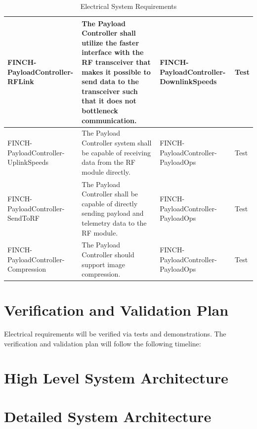 \documentclass[12pt,a4paper]{article}
\begin{document}
\begin{table}[H]
\begin{tabular}{|>{\centering\arraybackslash}m{3cm}
    |>{\raggedright\arraybackslash}m{7cm}
    |>{\centering\arraybackslash}m{3cm}
    |>{\centering\arraybackslash}m{2.5cm}|}
    FINCH-PayloadController-RFLink               & The Payload Controller shall utilize the faster interface with the RF transceiver that makes it possible to send data to the transceiver such that it does not bottleneck communication. & FINCH-PayloadController-DownlinkSpeeds & Test                         \\\hline
    FINCH-PayloadController-UplinkSpeeds         & The Payload Controller system shall be capable of receiving data from the RF module directly.                                                                                            & FINCH-PayloadController-PayloadOps     & Test                         \\\hline
    FINCH-PayloadController-SendToRF             & The Payload Controller shall be capable of directly sending payload and telemetry data to the RF module.                                                                                 & FINCH-PayloadController-PayloadOps     & Test                         \\\hline
    FINCH-PayloadController-Compression          & The Payload Controller should support image compression.                                                                                                                                 & FINCH-PayloadController-PayloadOps     & Test                         \\\hline
  \end{tabular}
  \caption{Electrical System Requirements}\label{tab:pay_reqs}
\end{table}



\section{Verification and Validation Plan}\label{sec:verifcation_validation}
Electrical requirements will be verified via tests and demonstrations. The verification and validation plan will follow the following timeline:



\section{High Level System Architecture}

\section{Detailed System Architecture}
\end{document}
